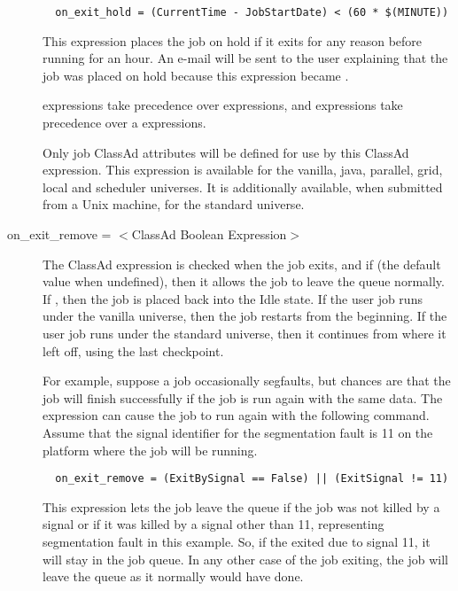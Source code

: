 \begin{description}
\footnotesize
\begin{verbatim}
  on_exit_hold = (CurrentTime - JobStartDate) < (60 * $(MINUTE))
\end{verbatim}
\normalsize

This expression places the job on hold if it exits for any reason
before running for an hour. An e-mail will be sent to the user explaining
that the job was placed on hold because this expression became .

 expressions take
precedence over  expressions,
and  expressions take
precedence over a  expressions.

Only job ClassAd attributes will be defined for use by this ClassAd expression.
This expression is available for the vanilla, java, parallel, grid,
local and scheduler universes.
It is additionally available, when submitted from a Unix machine,
for the standard universe.


\item[on\_exit\_remove = $<$ClassAd Boolean Expression$>$] 
The ClassAd expression is checked when the job exits, and if 
(the default value when undefined),
then it allows the job to leave the queue normally.
If , then the job is placed back into the Idle state.
If the user job runs under the vanilla universe,
then the job restarts from the beginning.
If the user job runs under the standard universe,
then it continues from where it left off, using the last checkpoint.

For example,
suppose a job occasionally segfaults,
but chances are that the job will finish successfully
if the job is run again with the same data.
The  expression can cause the job
to run again with the following command.
Assume that the signal identifier for the segmentation fault is 11 on the
platform where the job will be running.
\footnotesize
\begin{verbatim}
  on_exit_remove = (ExitBySignal == False) || (ExitSignal != 11)
\end{verbatim}
\normalsize
This expression lets the job leave the queue if the job was
not killed by a signal or if it was
killed by a signal other than 11, representing segmentation fault in
this example.
So, if the exited due to signal 11, it will stay in the job queue.
In any other case of the job exiting,
the job will leave the queue as it normally would have done.


\end{description}
